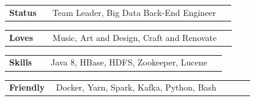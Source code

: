 \documentclass[10pt,A4]{article}
\newcommand{\tzlarrow}{(0,0) -- (0.2,0) -- (0.3,0.2) -- (0.2,0.4) -- (0,0.4) -- (0.1,0.2) -- cycle;}
\newcommand{\larrow}[1]
{\begin{tikzpicture}[scale=0.58]
	 \filldraw[fill=#1!100,draw=#1!100!black]  \tzlarrow
 \end{tikzpicture}
}
\newcommand{\metasection}[2]{
	\begin{tabular*}{1\linewidth}{p{0.18\linewidth} p{0.76\linewidth}}
		\larrow{bgcol}\normalsize{\textbf{\textcolor{sectcol}{#1}}}&#2\\
	\end{tabular*}
}
\newcommand{\spread}{7pt}
\begin{document}
\begin{minipage}[t]{0.485\textwidth}

\vspace{\spread}

\metasection{Status}{Team Leader, Big Data Back-End Engineer}
\metasection{Loves}{Music, Art and Design, Craft and Renovate}
\end{minipage}
\hfill
\begin{minipage}[t]{0.485\textwidth}

\vspace{5pt}

\metasection{Skills}{Java 8, HBase, HDFS, Zookeeper, Lucene}
\metasection{Friendly}{Docker, Yarn, Spark, Kafka, Python, Bash}

\end{minipage}
\hfill
\end{document}
